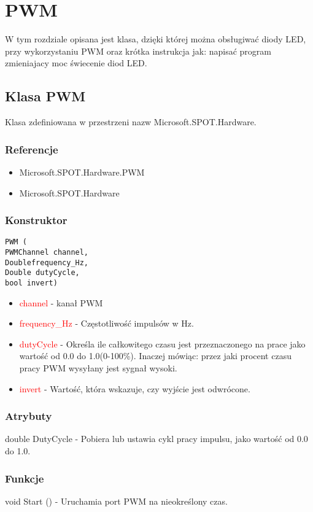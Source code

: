 \documentclass{article}
\begin{document}
\section{PWM}
W tym rozdziale opisana jest klasa, dzięki której można obsługiwać diody LED, przy wykorzystaniu PWM oraz krótka instrukcja jak: napisać program zmieniajacy moc świecenie diod LED.
\subsection{Klasa PWM}
Klasa zdefiniowana w przestrzeni nazw Microsoft.SPOT.Hardware. 
\subsubsection{Referencje}
\begin{itemize}
\item Microsoft.SPOT.Hardware.PWM
\item Microsoft.SPOT.Hardware
\end{itemize}
\subsubsection{Konstruktor}
\begin{lstlisting}[frame=single] 
PWM (
PWMChannel channel,
Doublefrequency_Hz, 
Double dutyCycle,  
bool invert)
\end{lstlisting}
\begin{itemize}
\item \textcolor{red}{channel} - kanał PWM
\item \textcolor{red}{frequency\_Hz} - Częstotliwość impulsów w Hz.
\item \textcolor{red}{dutyCycle} - Określa ile całkowitego czasu jest przeznaczonego na prace jako wartość od 0.0 do 1.0(0-100\%). Inaczej mówiąc: przez jaki procent czasu pracy PWM wysyłany jest sygnał wysoki.
\item \textcolor{red}{invert} - Wartość, która wskazuje, czy wyjście jest odwrócone.
\end{itemize}
\subsubsection{Atrybuty}
double DutyCycle - Pobiera lub ustawia cykl pracy impulsu, jako wartość od 0.0 do 1.0.
\subsubsection{Funkcje}
void Start () - Uruchamia port PWM na nieokreślony czas.
\end{document}
